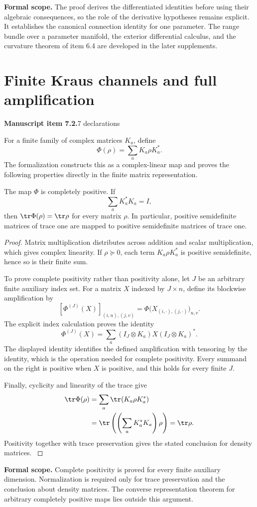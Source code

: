\textbf{Formal scope.} The proof derives the differentiated identities before using their algebraic consequences, so the role of the derivative hypotheses remains explicit. It establishes the canonical connection identity for one parameter. The range bundle over a parameter manifold, the exterior differential calculus, and the curvature theorem of item 6.4 are developed in the later supplements.





\section{Finite Kraus channels and full amplification}\label{supp2:section:005}
\textbf{Manuscript item 7.2.}\quad {}\hfill 7 declarations

For a finite family of complex matrices $K_a$, define
\[
 \Phi(\rho)=\sum_a K_a\rho K_a^*.
\]
The formalization constructs this as a complex-linear map and proves the following properties directly in the finite matrix representation.

\begin{statement}\label{supp2:statement:005}
The map $\Phi$ is completely positive. If
\[
 \sum_aK_a^*K_a=I,
\]
then $\tr\Phi(\rho)=\tr\rho$ for every matrix $\rho$. In particular, positive semidefinite matrices of trace one are mapped to positive semidefinite matrices of trace one.
\end{statement}

\begin{proof}\label{supp2:proof:005}
Matrix multiplication distributes across addition and scalar multiplication, which gives complex linearity. If $\rho\succeq0$, each term $K_a\rho K_a^*$ is positive semidefinite, hence so is their finite sum.

To prove complete positivity rather than positivity alone, let $J$ be an arbitrary finite auxiliary index set. For a matrix $X$ indexed by $J\times n$, define its blockwise amplification by
\[
 [\Phi^{(J)}(X)]_{(i,u),(j,v)}
 =\Phi\bigl(X_{(i,\cdot),(j,\cdot)}\bigr)_{u,v}.
\]
The explicit index calculation proves the identity
\[
 \boxed{\quad
 \Phi^{(J)}(X)=\sum_a (I_J\otimes K_a)X(I_J\otimes K_a)^*.
 \quad}
\]
The displayed identity identifies the defined amplification with tensoring by the identity, which is the operation needed for complete positivity. Every summand on the right is positive when $X$ is positive, and this holds for every finite $J$.

Finally, cyclicity and linearity of the trace give
\begin{align*}
 \tr\Phi(\rho)
 &=\sum_a\tr(K_a\rho K_a^*)\\
 &=\tr\left(\left(\sum_aK_a^*K_a\right)\rho\right)
 =\tr\rho.
\end{align*}
Positivity together with trace preservation gives the stated conclusion for density matrices.
\label{supp2:proof:005:end}\end{proof}

\textbf{Formal scope.} Complete positivity is proved for every finite auxiliary dimension. Normalization is required only for trace preservation and the conclusion about density matrices. The converse representation theorem for arbitrary completely positive maps lies outside this argument.





